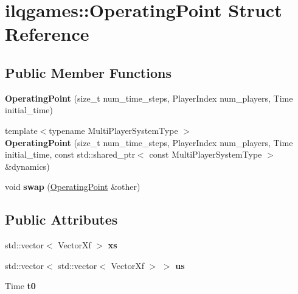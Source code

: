 \hypertarget{structilqgames_1_1_operating_point}{}\section{ilqgames\+:\+:Operating\+Point Struct Reference}
\label{structilqgames_1_1_operating_point}
\subsection*{Public Member Functions}
\begin{DoxyCompactItemize}
\item 
{\bfseries Operating\+Point} (size\+\_\+t num\+\_\+time\+\_\+steps, Player\+Index num\+\_\+players, Time initial\+\_\+time)\hypertarget{structilqgames_1_1_operating_point_a28dab0579fa6ece2f983c8eec32d6819}{}\label{structilqgames_1_1_operating_point_a28dab0579fa6ece2f983c8eec32d6819}

\item 
{\footnotesize template$<$typename Multi\+Player\+System\+Type $>$ }\\{\bfseries Operating\+Point} (size\+\_\+t num\+\_\+time\+\_\+steps, Player\+Index num\+\_\+players, Time initial\+\_\+time, const std\+::shared\+\_\+ptr$<$ const Multi\+Player\+System\+Type $>$ \&dynamics)\hypertarget{structilqgames_1_1_operating_point_aa7027d31067aa2a098a57b123eda53f8}{}\label{structilqgames_1_1_operating_point_aa7027d31067aa2a098a57b123eda53f8}

\item 
void {\bfseries swap} (\hyperlink{structilqgames_1_1_operating_point}{Operating\+Point} \&other)\hypertarget{structilqgames_1_1_operating_point_a373b480b0f424863bb2dfaced7cd2f6f}{}\label{structilqgames_1_1_operating_point_a373b480b0f424863bb2dfaced7cd2f6f}

\end{DoxyCompactItemize}
\subsection*{Public Attributes}
\begin{DoxyCompactItemize}
\item 
std\+::vector$<$ Vector\+Xf $>$ {\bfseries xs}\hypertarget{structilqgames_1_1_operating_point_a8d92a8f89457d4498cf0084e6752570d}{}\label{structilqgames_1_1_operating_point_a8d92a8f89457d4498cf0084e6752570d}

\item 
std\+::vector$<$ std\+::vector$<$ Vector\+Xf $>$ $>$ {\bfseries us}\hypertarget{structilqgames_1_1_operating_point_a69c62d532a1ab13a70e5dc40aede8a6a}{}\label{structilqgames_1_1_operating_point_a69c62d532a1ab13a70e5dc40aede8a6a}

\item 
Time {\bfseries t0}\hypertarget{structilqgames_1_1_operating_point_a04e5e484159428a29d8aa71cb83e5542}{}\label{structilqgames_1_1_operating_point_a04e5e484159428a29d8aa71cb83e5542}

\end{DoxyCompactItemize}


